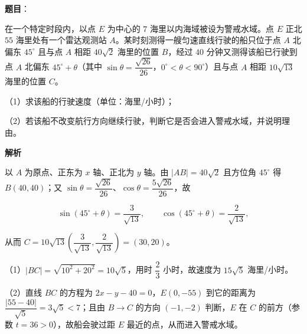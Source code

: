 \begin{answer}

\textbf{题目}：

在一个特定时段内，以点 $E$ 为中心的 $7$ 海里以内海域被设为警戒水域。点 $E$ 正北 $55$ 海里处有一个雷达观测站 $A$。某时刻测得一艘匀速直线行驶的船只位于点 $A$ 北偏东 $45^\circ$ 且与点 $A$ 相距 $40\sqrt2$ 海里的位置 $B$，经过 $40$ 分钟又测得该船已行驶到点 $A$ 北偏东 $45^\circ+\theta$（其中 $\sin\theta=\dfrac{\sqrt{26}}{26}$，$0^\circ<\theta<90^\circ$）且与点 $A$ 相距 $10\sqrt{13}$ 海里的位置 $C$。

（1）求该船的行驶速度（单位：海里/小时）；

（2）若该船不改变航行方向继续行驶，判断它是否会进入警戒水域，并说明理由。

\textbf{解析}

以 $A$ 为原点、正东为 $x$ 轴、正北为 $y$ 轴。由 $|AB|=40\sqrt2$ 且方位角 $45^\circ$ 得 $B(40,40)$；又 $\sin\theta=\dfrac{\sqrt{26}}{26}$、$\cos\theta=\dfrac{5\sqrt{26}}{26}$，故

\nopagebreak[4]
\[\sin(45^\circ+\theta)=\frac3{\sqrt{13}},\qquad \cos(45^\circ+\theta)=\frac2{\sqrt{13}},\]

从而 $C=10\sqrt{13}\left(\dfrac3{\sqrt{13}},\dfrac2{\sqrt{13}}\right)=(30,20)$。

（1）$|BC|=\sqrt{10^2+20^2}=10\sqrt5$，用时 $\dfrac23$ 小时，故速度为 $15\sqrt5$ 海里/小时。

（2）直线 $BC$ 的方程为 $2x-y-40=0$，$E(0,-55)$ 到它的距离为 $\dfrac{|55-40|}{\sqrt5}=3\sqrt5<7$；且由 $B\to C$ 的方向 $(-1,-2)$ 判断，$E$ 在 $C$ 的前方（参数 $t=36>0$），故船会驶过距 $E$ 最近的点，从而进入警戒水域。


\end{answer}
